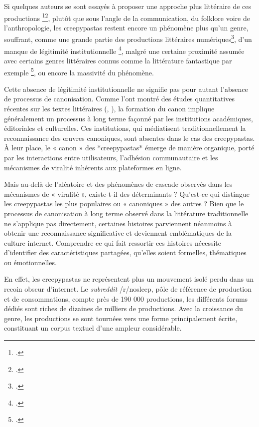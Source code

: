 \documentclass[12pt,a4paper,oneside,titlepage]{book} %
\begin{document}
Si quelques auteurs se sont essayés à proposer une approche plus littéraire de ces productions \footcite{garcia_roca_fundacion_2021}\footcite{garcia_roca_creepypasta_2021}, plutôt que sous l'angle de la communication, du folklore voire de l'anthropologie, les creepypastas restent encore un phénomène plus qu'un genre, souffrant, comme une grande partie des productions littéraires numériques\footcite{lata_du_2022}, d'un manque de légitimité institutionnelle \footcite{saemmer_litterature_2011}, malgré une certaine proximité assumée avec certains genres littéraires connus comme la littérature fantastique par exemple \footcite{evans_slender_2018}, ou encore la massivité du phénomène.

Cette absence de légitimité institutionnelle ne signifie pas pour autant l'absence de processus de canonisation. Comme l'ont montré des études quantitatives récentes sur les textes littéraires (\cite{algee-hewitt-between-2015}, \cite{underwood_distant_2019}), la formation du canon implique généralement un processus à long terme façonné par les institutions académiques, éditoriales et culturelles. Ces institutions, qui médiatisent traditionnellement la reconnaissance des œuvres canoniques, sont absentes dans le cas des creepypastas. À leur place, le « canon » des *creepypastas* émerge de manière organique, porté par les interactions entre utilisateurs, l'adhésion communautaire et les mécanismes de viralité inhérents aux plateformes en ligne.

Mais au-delà de l'aléatoire et des phénomènes de cascade observés dans les mécanismes de « viralité », existe-t-il des déterminants ? Qu'est-ce qui distingue les creepypastas les plus populaires ou « canoniques » des autres ? Bien que le processus de canonisation à long terme observé dans la littérature traditionnelle ne s'applique pas directement, certaines histoires parviennent néanmoins à obtenir une reconnaissance significative et deviennent emblématiques de la culture internet. Comprendre ce qui fait ressortir ces histoires nécessite d'identifier des caractéristiques partagées, qu'elles soient formelles, thématiques ou émotionnelles.

En effet, les creepypastas ne représentent plus un mouvement isolé perdu dans un recoin obscur d'internet. Le \textit{subreddit} /r/nosleep, pôle de référence de production et de consommations, compte près de 190 000 productions, les différents forums dédiés sont riches de dizaines de milliers de productions. Avec la croissance du genre, les productions se sont tournées vers une forme principalement écrite, constituant un corpus textuel d'une ampleur considérable.
\end{document}
